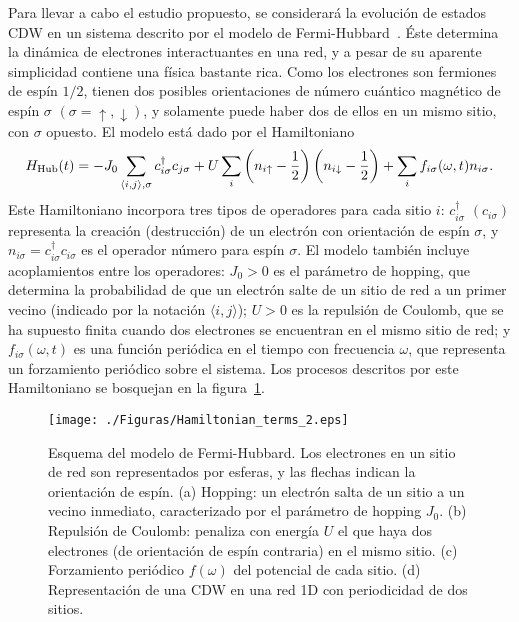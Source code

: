 \documentclass[a4paper,10pt]{article}
\begin{document}
Para llevar a cabo el estudio propuesto, se considerar\'a la evoluci\'on de estados CDW en un sistema descrito por el modelo de Fermi-Hubbard~\cite{mahan}. \'Este determina la din\'amica de electrones interactuantes en una red, y a pesar de su aparente simplicidad contiene una f\'isica bastante rica. Como los electrones son fermiones de esp\'in $1/2$, tienen dos posibles orientaciones de n\'umero cu\'antico magn\'etico de esp\'in $\sigma$ $(\sigma=\uparrow,\downarrow)$, y solamente puede haber dos de ellos en un mismo sitio, con $\sigma$ opuesto. El modelo est\'a dado por el Hamiltoniano 
\begin{equation} \label{hami_hubbard}
H_{\rm Hub}(t) = -J_0\sum_{\langle i,j\rangle,\sigma} c_{i\sigma}^{\dagger}c_{j\sigma}+U\sum_i\left(n_{i\uparrow}-\frac{1}{2}\right)\left(n_{i\downarrow}-\frac{1}{2}\right)+\sum_if_{i\sigma}(\omega,t)n_{i\sigma}.
\end{equation}
Este Hamiltoniano incorpora tres tipos de operadores para cada sitio $i$: $c_{i\sigma}^{\dagger}$ $(c_{i\sigma})$ representa la creaci\'on (destrucci\'on) de un electr\'on con orientaci\'on de esp\'in $\sigma$, y $n_{i\sigma}=c_{i\sigma}^{\dagger}c_{i\sigma}$ es el operador n\'umero para esp\'in $\sigma$. El modelo tambi\'en incluye acoplamientos entre los operadores: $J_0>0$ es el par\'ametro de hopping, que determina la probabilidad de que un electr\'on salte de un sitio de red a un primer vecino (indicado por la notaci\'on $\langle i,j\rangle$); $U>0$ es la repulsi\'on de Coulomb, que se ha supuesto finita cuando dos electrones se encuentran en el mismo sitio de red; y $f_{i\sigma}(\omega,t)$ es una funci\'on peri\'odica en el tiempo con frecuencia $\omega$, que representa un forzamiento peri\'odico sobre el sistema. Los procesos descritos por este Hamiltoniano se bosquejan en la figura~\ref{hamiltoniano_y_cdw}. 

\begin{figure}
\begin{center}
\texttt{[image: ./Figuras/Hamiltonian\_terms\_2.eps]}
\caption{\label{hamiltoniano_y_cdw} Esquema del modelo de Fermi-Hubbard. Los electrones en un sitio de red son representados por esferas, y las flechas indican la orientaci\'on de esp\'in. (a) Hopping: un electr\'on salta de un sitio a un vecino inmediato, caracterizado por el par\'ametro de hopping $J_0$. (b) Repulsi\'on de Coulomb: penaliza con energ\'ia $U$ el que haya dos electrones (de orientaci\'on de esp\'in contraria) en el mismo sitio. (c) Forzamiento peri\'odico $f(\omega)$ del potencial de cada sitio. (d) Representaci\'on de una CDW en una red 1D con periodicidad de dos sitios.}
\end{center}
\end{figure}
\end{document}
